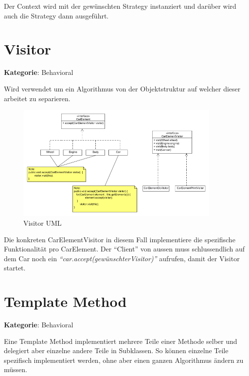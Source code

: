 Der Context wird mit der gewünschten Strategy instanziert und darüber wird auch die Strategy dann ausgeführt.

\section{Visitor}
\textbf{Kategorie}: Behavioral

Wird verwendet um ein Algorithmus von der Objektstruktur auf welcher dieser arbeitet zu separieren.

\begin{figure}[H]
	\centering
	\includegraphics[width=0.9\textwidth]{content/gof/images/17-visitor-uml.png}
	\caption{Visitor UML}
\end{figure}


Die konkreten CarElementVisitor in diesem Fall implementiere die spezifische Funktionalität pro CarElement.
Der ``Client'' von aussen muss schlussendlich auf dem Car noch ein \textit{``car.accept(gewünschterVisitor)''} aufrufen, damit der Visitor startet.


\section{Template Method}
\textbf{Kategorie}: Behavioral

Eine Template Method implementiert mehrere Teile einer Methode selber und delegiert aber einzelne andere Teile in Subklassen. So können einzelne Teile spezifisch implementiert werden, ohne aber einen ganzen Algorithmus ändern zu müssen.

